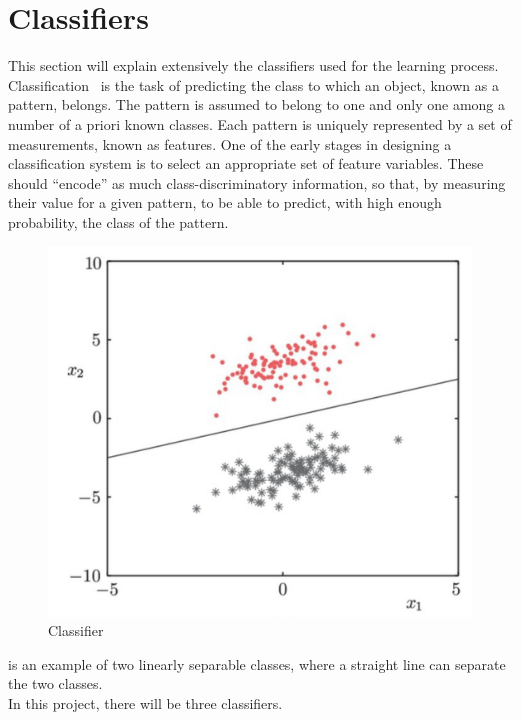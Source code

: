 \section{Classifiers}
\label{sec:clasif}
This section will explain extensively the classifiers used for the learning process.\\
Classification~\cite{classif} is the task of predicting the class to which an object, known as a pattern, belongs. The pattern is assumed to belong to one and only one among a number of a priori known classes. Each pattern is uniquely represented by a set of measurements, known as features. One of the early stages in designing a classification system is to select an appropriate set of feature variables. These should “encode” as much class-discriminatory information, so that, by measuring their value for a given pattern, to be able to predict, with high enough probability, the class of the pattern. 
\begin{figure}
	\includegraphics[width=\linewidth]{img/classifier.png}
	\caption{Classifier~\cite{classif}}
	\label{fig:classifier}
\end{figure}
 is an example of two linearly separable classes, where a straight line can separate the two classes. \\
In this project, there will be three classifiers.
